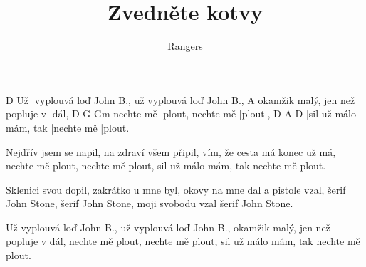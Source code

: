 \documentclass{song}
\title{Zvedněte kotvy}
\author{Rangers}
\begin{document}
\strophe
   D
Už |vyplouvá loď John B., už vyplouvá loď John B.,
                                A\7
okamžik malý, jen než popluje v |dál,
          D                 G     Gm
nechte mě |plout, nechte mě |plout|,
D                     A\7        D
|sil už málo mám, tak |nechte mě |plout.
\endstrophe

\strophe*
Nejdřív jsem se napil, na zdraví všem připil,
vím, že cesta má konec už má,
nechte mě plout, nechte mě plout,
sil už málo mám, tak nechte mě plout.
\endstrophe

\strophe*
Sklenici svou dopil, zakrátko u mne byl,
okovy na mne dal a pistole vzal,
šerif John Stone, šerif John Stone,
moji svobodu vzal šerif John Stone.
\endstrophe

\strophe*
Už vyplouvá loď John B., už vyplouvá loď John B.,
okamžik malý, jen než popluje v dál,
nechte mě plout, nechte mě plout,
sil už málo mám, tak nechte mě plout.
\endstrophe
\end{document}
